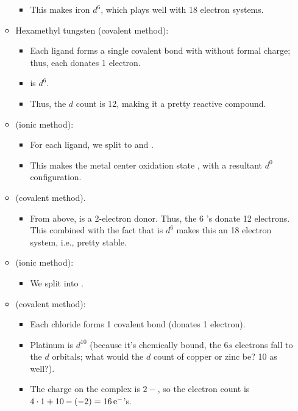 \documentclass[../notes.tex]{subfiles}
\begin{document}
\begin{itemize}
\begin{itemize}
\begin{itemize}
            \item This makes iron $d^6$, which plays well with 18 electron systems.
        \end{itemize}
        \item Hexamethyl tungsten  (covalent method):
        \begin{itemize}
            \item Each  ligand forms a single covalent bond with  without formal charge; thus, each donates 1 electron.
            \item {} is $d^6$.
            \item Thus, the $d$ count is 12, making it a pretty reactive compound.
        \end{itemize}
        \item {} (ionic method):
        \begin{itemize}
            \item For each ligand, we split to  and .
            \item This makes the metal center oxidation state , with a resultant $d^0$ configuration.
        \end{itemize}
        \item {} (covalent method).
        \begin{itemize}
            \item From above,  is a 2-electron donor. Thus, the 6 's donate 12 electrons. This combined with the fact that  is $d^6$ makes this an 18 electron system, i.e., pretty stable.
        \end{itemize}
        \item {} (ionic method):
        \begin{itemize}
            \item We split  into .
        \end{itemize}
        \item {} (covalent method):
        \begin{itemize}
            \item Each chloride forms 1 covalent bond (donates 1 electron).
            \item Platinum is $d^{10}$ (because it's chemically bound, the $6s$ electrons fall to the $d$ orbitals; what would the $d$ count of copper or zinc be? 10 as well?).
            \item The charge on the complex is $2-$, so the electron count is $4\cdot 1+10-(-2)=16\,\e[-]$'s.

\end{itemize}
\end{itemize}
\end{itemize}
\end{document}
